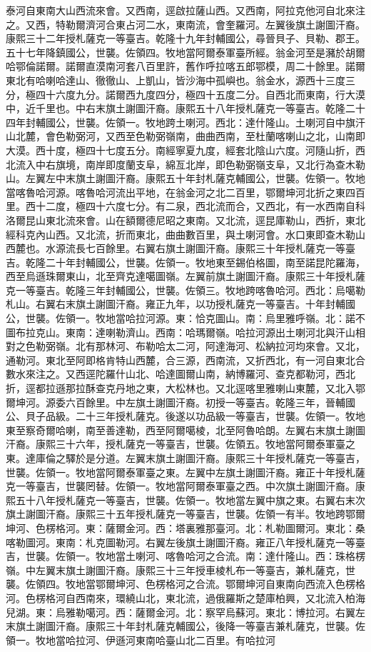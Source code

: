 \begin{pinyinscope}
泰河自東南大山西流來會。又西南，逕啟拉薩山西。又西南，阿拉克他河自北來注之。又西，特勒爾濟河合東占河二水，東南流，會奎羅河。左翼後旗土謝圖汗裔。康熙三十二年授札薩克一等臺吉。乾隆十九年封輔國公，尋晉貝子、貝勒、郡王。五十七年降鎮國公，世襲。佐領四。牧地當阿爾泰軍臺所經。翁金河至是瀦於胡爾哈鄂倫諾爾。諾爾直漠南河套八百里許，舊作呼拉喀五郎鄂模，周二十餘里。諾爾東北有哈喇哈達山、徹徹山、上凱山，皆沙海中孤嶼也。翁金水，源西十三度三分，極四十六度九分。諾爾西九度四分，極四十五度二分。自西北而東南，行大漠中，近千里也。中右末旗土謝圖汗裔。康熙五十八年授札薩克一等臺吉。乾隆二十四年封輔國公，世襲。佐領一。牧地跨土喇河。西北：達什隆山。土喇河自中旗汗山北麓，會色勒弼河，又西至色勒弼嶺南，曲曲西南，至杜蘭喀喇山之北，山南即大漠。西十度，極四十七度五分。南經寧夏九度，經套北陰山六度。河隨山折，西北流入中右旗境，南岸即度蘭支阜，綿亙北岸，即色勒弼嶺支阜，又北行為查木勒山。左翼左中末旗土謝圖汗裔。康熙五十年封札薩克輔國公，世襲。佐領一。牧地當喀魯哈河源。喀魯哈河流出平地，在翁金河之北二百里，鄂爾坤河北折之東四百里。西十二度，極四十六度七分。有二泉，西北流而合，又西北，有一水西南自科洛爾昆山東北流來會。山在額爾德尼昭之東南。又北流，逕昆庫勒山，西折，東北經科克內山西。又北流，折而東北，曲曲數百里，與土喇河會。水口東即查木勒山西麓也。水源流長七百餘里。右翼右旗土謝圖汗裔。康熙三十年授札薩克一等臺吉。乾隆二十年封輔國公，世襲。佐領一。牧地東至錫伯格圖，南至諾昆陀羅海，西至烏遜珠爾東山，北至齊克達噶圖嶺。左翼前旗土謝圖汗裔。康熙三十年授札薩克一等臺吉。乾隆三年封輔國公，世襲。佐領三。牧地跨喀魯哈河。西北：烏噶勒札山。右翼右末旗土謝圖汗裔。雍正九年，以功授札薩克一等臺吉。十年封輔國公，世襲。佐領一。牧地當哈拉河源。東：恰克圖山。南：烏里雅呼嶺。北：諾不圖布拉克山。東南：達喇勒濟山。西南：哈瑪爾嶺。哈拉河源出土喇河北與汗山相對之色勒弼嶺。北有那林河、布勒哈太二河，阿達海河、松納拉河均來會。又北，通勒河。東北至阿即格肯特山西麓，合三源，西南流，又折西北，有一河自東北合數水來注之。又西逕陀羅什山北、哈達圖爾山南，納博羅河、查克都勒河，西北折，逕都拉遜那拉酥查克丹地之東，大松林也。又北逕喀里雅喇山東麓，又北入鄂爾坤河。源委六百餘里。中左旗土謝圖汗裔。初授一等臺吉。乾隆三年，晉輔國公、貝子品級。二十三年授札薩克。後遂以功品級一等臺吉，世襲。佐領一。牧地東至察奇爾哈喇，南至善達勒，西至阿爾噶棱，北至阿魯哈朗。左翼右末旗土謝圖汗裔。康熙三十六年，授札薩克一等臺吉，世襲。佐領五。牧地當阿爾泰軍臺之東。達庫倫之驛於是分道。左翼末旗土謝圖汗裔。康熙三十年授札薩克一等臺吉，世襲。佐領一。牧地當阿爾泰軍臺之東。左翼中左旗土謝圖汗裔。雍正十年授札薩克一等臺吉，世襲罔替。佐領一。牧地當阿爾泰軍臺之西。中次旗土謝圖汗裔。康熙五十八年授札薩克一等臺吉，世襲。佐領一。牧地當左翼中旗之東。右翼右末次旗土謝圖汗裔。康熙三十五年授札薩克一等臺吉，世襲。佐領一有半。牧地跨鄂爾坤河、色楞格河。東：薩爾金河。西：塔裏雅那臺河。北：札勒圖爾河。東北：桑喀勒圖河。東南：札克圖勒河。右翼左後旗土謝圖汗裔。雍正八年授札薩克一等臺吉，世襲。佐領一。牧地當土喇河、喀魯哈河之合流。南：達什隆山。西：珠格楞嶺。中左翼末旗土謝圖汗裔。康熙三十三年授車棱札布一等臺吉，兼札薩克，世襲。佐領四。牧地當鄂爾坤河、色楞格河之合流。鄂爾坤河自東南向西流入色楞格河。色楞格河自西南來，環繞山北，東北流，過俄羅斯之楚庫柏興，又北流入柏海兒湖。東：烏雅勒噶河。西：薩爾金河。北：察罕烏蘇河。東北：博拉河。右翼左末旗土謝圖汗裔。康熙三十年封札薩克輔國公，後降一等臺吉兼札薩克，世襲。佐領一。牧地當哈拉河、伊遜河東南哈臺山北二百里。有哈拉河
\end{pinyinscope}
